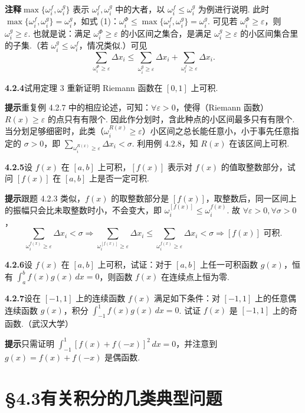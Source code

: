 \documentclass[UTF8,12pt,a4paper,fontset=fandol]{ctexart}
\begin{document}
\noindent\textbf{注释}\quad $\max\{\omega_i^f,\omega_i^g\}$ 表示 $\omega_i^f,\omega_i^g$ 中的大者，以 $\omega_i^f\le\omega_i^g$ 为例进行说明. 此时 $\max\{\omega_i^f,\omega_i^g\}=\omega_i^g$，如式 (1)：$\omega_i^\Phi\le\max\{\omega_i^f,\omega_i^g\}=\omega_i^g$. 可见若 $\omega_i^\Phi\ge\varepsilon$，则 $\omega_i^g\ge\varepsilon$. 也就是说：满足 $\omega_i^\Phi\ge\varepsilon$ 的小区间之集合，是满足 $\omega_i^g\ge\varepsilon$ 的小区间集合里的子集.（若 $\omega_i^g\le\omega_i^f$，情况类似.）可见
\[
\sum_{\omega_i^\Phi\ge\varepsilon}\Delta x_i
\le
\sum_{\omega_i^g\ge\varepsilon}\Delta x_i
+
\sum_{\omega_i^f\ge\varepsilon}\Delta x_i.
\]

\noindent\textbf{4.2.4}\quad 试用定理 3 重新证明 Riemann 函数在 $[0,1]$ 上可积.

\noindent\textbf{提示}\quad 重复例 4.2.7 中的相应论述，可知：$\forall\varepsilon>0$，使得（Riemann 函数）$R(x)\ge\varepsilon$ 的点只有有限个. 因此作分划时，含此种点的小区间最多只有有限个. 当分划足够细密时，此类（$\omega_i^{R(x)}\ge\varepsilon$）小区间之总长能任意小，小于事先任意指定的 $\sigma>0$，即 $\sum_{\omega_i^{R(x)}\ge\varepsilon}\Delta x_i<\sigma$. 利用例 4.2.8，知 $R(x)$ 在该区间上可积.

\noindent\textbf{4.2.5}\quad 设 $f(x)$ 在 $[a,b]$ 上可积，$[f(x)]$ 表示对 $f(x)$ 的值取整数部分，试问 $[f(x)]$ 在 $[a,b]$ 上是否一定可积.

\noindent\textbf{提示}\quad 跟题 4.2.3 类似，$f(x)$ 的取整数部分是 $[f(x)]$，取整数后，同一区间上的振幅只会比未取整数时小，不会变大，即 $\omega_i^{[f(x)]}\le\omega_i^{f(x)}$. 故 $\forall\varepsilon>0,\forall\sigma>0$，
\[
\sum_{\omega_i^{f(x)}\ge\varepsilon}\Delta x_i<\sigma
\Rightarrow
\sum_{\omega_i^{[f(x)]}\ge\varepsilon}\Delta x_i
\le
\sum_{\omega_i^{f(x)}\ge\varepsilon}\Delta x_i<\sigma
\Rightarrow [f(x)]\text{ 可积.}
\]

\noindent\textbf{4.2.6}\quad 设 $f(x)$ 在 $[a,b]$ 上可积，试证：对于 $[a,b]$ 上任一可积函数 $g(x)$，恒有 $\int_a^b f(x)g(x)\,dx=0$，则函数 $f(x)$ 在连续点上恒为零.

\noindent\textbf{4.2.7}\quad 设在 $[-1,1]$ 上的连续函数 $f(x)$ 满足如下条件：对 $[-1,1]$ 上的任意偶连续函数 $g(x)$，积分 $\int_{-1}^1 f(x)g(x)\,dx=0$. 试证 $f(x)$ 是 $[-1,1]$ 上的奇函数.（武汉大学）

\noindent\textbf{提示}\quad 只需证明 $\int_{-1}^1[f(x)+f(-x)]^2\,dx=0$，并注意到 $g(x)=f(x)+f(-x)$ 是偶函数.

\section*{§4.3\quad 有关积分的几类典型问题}
\end{document}
